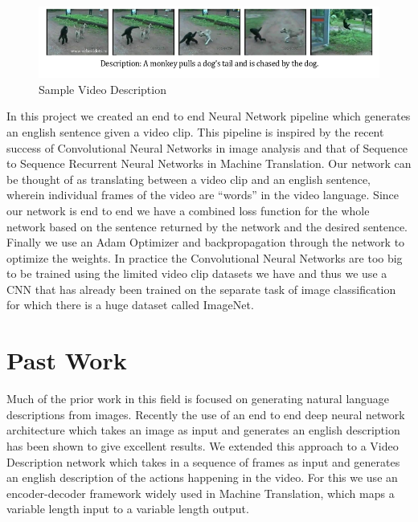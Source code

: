 \documentclass[12pt]{article}
\begin{document}
		\begin{figure}[ht!]
		\centering
		\includegraphics[width=1.0\textwidth]{description.png}
		\caption{Sample Video Description\label{fig0}}
		\end{figure}		
In this project we created an end to end Neural Network pipeline which generates an english sentence given a video clip. This pipeline is inspired by the recent success of Convolutional Neural Networks in image analysis and that of Sequence to Sequence Recurrent Neural Networks in Machine Translation. Our network can be thought of as translating between a video clip and an english sentence, wherein individual frames of the video are ``words'' in the video language. Since our network is end to end we have a combined loss function for the whole network based on the sentence returned by the network and the desired sentence. Finally we use an Adam Optimizer and backpropagation through the network to optimize the weights. In practice the Convolutional Neural Networks are too big to be trained using the limited video clip datasets we have and thus we use a CNN that has already been trained on the separate task of image classification for which there is a huge dataset called ImageNet.

	\section{Past Work}

		Much of the prior work in this field is focused on generating natural language descriptions from images. Recently the use of an end to end deep neural network architecture which takes an image as input and generates an english description has  been shown to give excellent results. We extended this approach to a Video Description network which takes in a sequence of frames as input and generates an english description of the actions happening in the video. For this we use an encoder-decoder framework widely used in Machine Translation, which maps a variable length input to a variable length output. 
\end{document}
